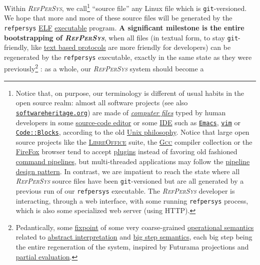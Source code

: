 \documentclass[11pt,a4paper,svgnames]{article}
\newcommand{\RefPerSys}{{\textit{\textsc{RefPerSys}}}}
\begin{document}
Within {\RefPerSys}, we call\footnote{Notice that, on purpose, our
terminology is different of usual habits in the open source realm:
almost all software projects (see also
\href{http://softwareheritage.org}{\texttt{softwareheritage.org}}) are
made of
\href{https://en.wikipedia.org/wiki/Computer\_file}{\textit{computer
    files}} typed by human developers in some
\href{https://en.wikipedia.org/wiki/Source-code\_editor}{source-code
  editor} or some
\href{https://en.wikipedia.org/wiki/Integrated\_development\_environment}{IDE}
such as \href{https://www.gnu.org/software/emacs/}{\texttt{Emacs}},
\href{http://vim.org/}{\texttt{vim}} or
\href{http://codeblocks.org/}{\texttt{Code::Blocks}}, according to the
old \href{https://en.wikipedia.org/wiki/Unix\_philosophy}{Unix
  philosophy}. Notice that large open source projects like the
\href{https://www.libreoffice.org/}{\textsc{LibreOffice}} suite, the
\href{http://gcc.gnu.org}{\textsc{Gcc}} compiler collection or the
\href{https://www.mozilla.org/en-US/firefox/}{FireFox} browser tend to
accept
\href{https://en.wikipedia.org/wiki/Plug-in_(computing)}{plugins}
instead of favoring old fashioned
\href{https://en.wikipedia.org/wiki/Pipeline_(Unix)}{command
  pipelines}, but multi-threaded applications may follow the
\href{https://en.wikipedia.org/wiki/Pipeline_(software)}{pipeline
  design pattern}. In contrast, we are impatient to reach the state
where all {\RefPerSys} source files have been \texttt{git}-versioned
but are all generated by a previous run of our \texttt{refpersys}
executable. The {\RefPerSys} developer is interacting, through a web
interface, with some running \texttt{refpersys} process, which is also some
specialized web server (using  HTTP).}  ``source file'' any Linux file which is
\texttt{git}-versioned. We hope that more and more of these source
files will be generated by the \texttt{refpersys}
\href{https://en.wikipedia.org/wiki/Executable\_and\_Linkable_Format}{ELF}
\href{https://en.wikipedia.org/wiki/Executable}{executable}
program. \textbf{A significant milestone is the entire bootstrapping
  of \RefPerSys}, when all files (in textual form, to stay
\texttt{git}-friendly, like
\href{https://en.wikipedia.org/wiki/Text-based_protocol}{text based
  protocols} are more friendly for developers) can be regenerated by
the \texttt{refpersys} executable, exactly in the same state as they
were previously\footnote{Pedantically, some
\href{https://en.wikipedia.org/wiki/Fixed\_point\_(mathematics)}{fixpoint}
of some very coarse-grained
\href{https://en.wikipedia.org/wiki/Operational\_semantics}{operational
  semantics} related to
\href{https://en.wikipedia.org/wiki/Abstract\_interpretation}{abstract
  interpretation} and
\href{https://en.wikipedia.org/wiki/Operational\_semantics\#Structural\_operational\_semantics}{big
  step semantics}, each big step being the entire regeneration of the
system, inspired by Futurama projections and
\href{https://en.wikipedia.org/wiki/Partial\_evaluation}{partial
  evaluation}.} : as a whole, our {\RefPerSys} system should become a
\end{document}
